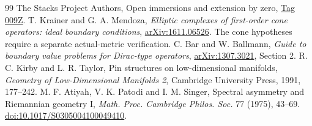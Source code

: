 \documentclass[11pt]{article}
\theoremstyle{readable}
\theoremstyle{remark}\newtheorem{remark}[theorem]{Remark}
\begin{document}
\begin{thebibliography}{99}
 The Stacks Project Authors, Open immersions and extension by
zero, \href{https://stacks.math.columbia.edu/tag/009Z}{Tag 009Z}.
 T. Krainer and G. A. Mendoza, \emph{Elliptic complexes of
first-order cone operators: ideal boundary conditions},
\href{https://arxiv.org/abs/1611.06526}{arXiv:1611.06526}. The cone
hypotheses require a separate actual-metric verification.
 C. Bar and W. Ballmann, \emph{Guide to boundary value problems
for Dirac-type operators},
\href{https://arxiv.org/abs/1307.3021}{arXiv:1307.3021}, Section 2.
 R. C. Kirby and L. R. Taylor, Pin structures on low-dimensional
manifolds, \emph{Geometry of Low-Dimensional Manifolds 2}, Cambridge
University Press, 1991, 177--242.
 M. F. Atiyah, V. K. Patodi and I. M. Singer, Spectral asymmetry
and Riemannian geometry I, \emph{Math. Proc. Cambridge Philos. Soc.} 77
(1975), 43--69. \href{https://doi.org/10.1017/S0305004100049410}{doi:10.1017/S0305004100049410}.
\end{thebibliography}
\end{document}
